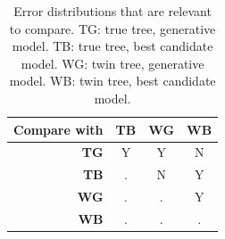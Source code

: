 \documentclass{article}
\begin{document}
\begin{table}
  \begin{tabular}{ | r | c | c | c | }
    \hline
    \textbf{Compare with} & \textbf{TB} & \textbf{WG} & \textbf{WB} \\ 
    \hline
    \textbf{TG} & Y & Y & N \\
    \textbf{TB} & . & N & Y \\
    \textbf{WG} & . & . & Y \\
    \textbf{WB} & . & . & . \\
    \hline
  \end{tabular}
  \caption{
    Error distributions that are relevant to compare.
    TG: true tree, generative model.
    TB: true tree, best candidate model.
    WG: twin tree, generative model.
    WB: twin tree, best candidate model.
  }
  \label{tab:relevant_comparisions}
\end{table}
\end{document}
